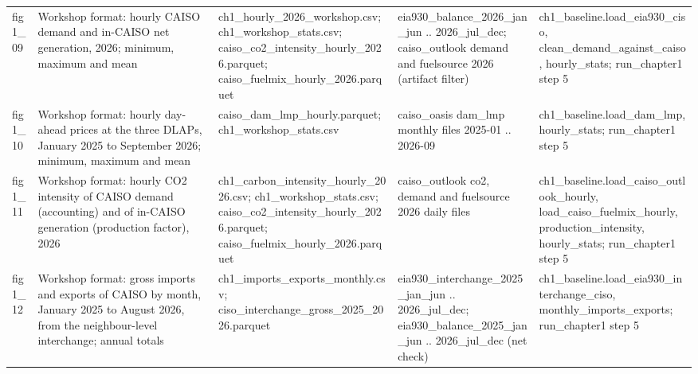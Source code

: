 \begin{tabular}{lp{4.6cm}p{5.2cm}p{4.6cm}p{4.8cm}}
fig1\_\allowbreak{}09 & Workshop format: hourly CAISO demand and in-CAISO net generation, 2026; minimum, maximum and mean & ch1\_\allowbreak{}hourly\_\allowbreak{}2026\_\allowbreak{}workshop.csv; ch1\_\allowbreak{}workshop\_\allowbreak{}stats.csv; caiso\_\allowbreak{}co2\_\allowbreak{}intensity\_\allowbreak{}hourly\_\allowbreak{}2026.parquet; caiso\_\allowbreak{}fuelmix\_\allowbreak{}hourly\_\allowbreak{}2026.parquet & eia930\_\allowbreak{}balance\_\allowbreak{}2026\_\allowbreak{}jan\_\allowbreak{}jun .. 2026\_\allowbreak{}jul\_\allowbreak{}dec; caiso\_\allowbreak{}outlook demand and fuelsource 2026 (artifact filter) & ch1\_\allowbreak{}baseline.load\_\allowbreak{}eia930\_\allowbreak{}ciso, clean\_\allowbreak{}demand\_\allowbreak{}against\_\allowbreak{}caiso, hourly\_\allowbreak{}stats; run\_\allowbreak{}chapter1 step 5 \\
fig1\_\allowbreak{}10 & Workshop format: hourly day-ahead prices at the three DLAPs, January 2025 to September 2026; minimum, maximum and mean & caiso\_\allowbreak{}dam\_\allowbreak{}lmp\_\allowbreak{}hourly.parquet; ch1\_\allowbreak{}workshop\_\allowbreak{}stats.csv & caiso\_\allowbreak{}oasis dam\_\allowbreak{}lmp monthly files 2025-01 .. 2026-09 & ch1\_\allowbreak{}baseline.load\_\allowbreak{}dam\_\allowbreak{}lmp, hourly\_\allowbreak{}stats; run\_\allowbreak{}chapter1 step 5 \\
fig1\_\allowbreak{}11 & Workshop format: hourly CO2 intensity of CAISO demand (accounting) and of in-CAISO generation (production factor), 2026 & ch1\_\allowbreak{}carbon\_\allowbreak{}intensity\_\allowbreak{}hourly\_\allowbreak{}2026.csv; ch1\_\allowbreak{}workshop\_\allowbreak{}stats.csv; caiso\_\allowbreak{}co2\_\allowbreak{}intensity\_\allowbreak{}hourly\_\allowbreak{}2026.parquet; caiso\_\allowbreak{}fuelmix\_\allowbreak{}hourly\_\allowbreak{}2026.parquet & caiso\_\allowbreak{}outlook co2, demand and fuelsource 2026 daily files & ch1\_\allowbreak{}baseline.load\_\allowbreak{}caiso\_\allowbreak{}outlook\_\allowbreak{}hourly, load\_\allowbreak{}caiso\_\allowbreak{}fuelmix\_\allowbreak{}hourly, production\_\allowbreak{}intensity, hourly\_\allowbreak{}stats; run\_\allowbreak{}chapter1 step 5 \\
fig1\_\allowbreak{}12 & Workshop format: gross imports and exports of CAISO by month, January 2025 to August 2026, from the neighbour-level interchange; annual totals & ch1\_\allowbreak{}imports\_\allowbreak{}exports\_\allowbreak{}monthly.csv; ciso\_\allowbreak{}interchange\_\allowbreak{}gross\_\allowbreak{}2025\_\allowbreak{}2026.parquet & eia930\_\allowbreak{}interchange\_\allowbreak{}2025\_\allowbreak{}jan\_\allowbreak{}jun .. 2026\_\allowbreak{}jul\_\allowbreak{}dec; eia930\_\allowbreak{}balance\_\allowbreak{}2025\_\allowbreak{}jan\_\allowbreak{}jun .. 2026\_\allowbreak{}jul\_\allowbreak{}dec (net check) & ch1\_\allowbreak{}baseline.load\_\allowbreak{}eia930\_\allowbreak{}interchange\_\allowbreak{}ciso, monthly\_\allowbreak{}imports\_\allowbreak{}exports; run\_\allowbreak{}chapter1 step 5 \\

\end{tabular}
